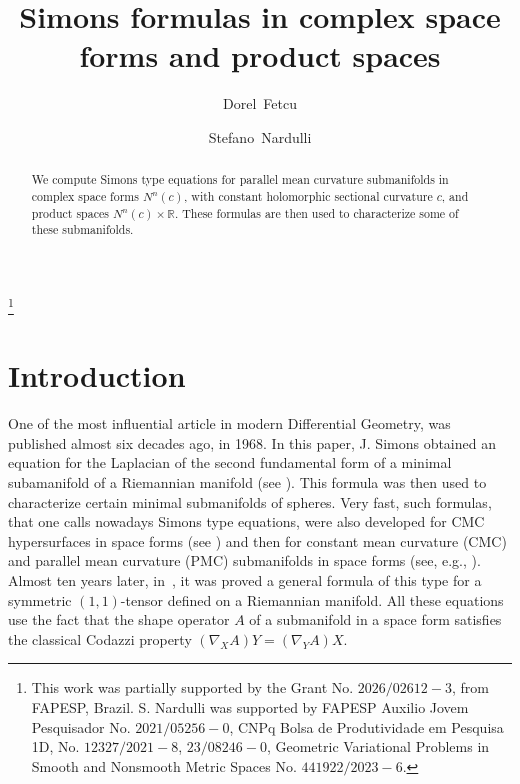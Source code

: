\documentclass[11pt]{amsart}
\theoremstyle{plain}
\theoremstyle{definition}
\numberwithin{equation}{section}
\begin{document}
\title[Simons Formulas]{Simons formulas in complex space forms and product spaces}

\author{Dorel~Fetcu}
\author{Stefano~Nardulli}

\thanks{This work was partially supported by the Grant No. $2026/02612-3$, from FAPESP, Brazil. S. Nardulli was supported by FAPESP Auxilio Jovem Pesquisador No. $2021/05256-0$, CNPq Bolsa de Produtividade em Pesquisa 1D, No. $12327/2021-8$, $23/08246-0$, Geometric Variational Problems in Smooth and Nonsmooth
Metric Spaces No. $441922/2023-6$.}

\address{Department of Mathematics and Informatics\\
Gh. Asachi Technical University of Iasi\\
Bd. Carol I, 11A \\
700506 Iasi, Romania} 

\address{Department of Mathematics\\ Federal University of ABC\\
09210-580, Santo Andr\'e-SP, Brazil}





\begin{abstract} We compute Simons type equations for parallel mean curvature submanifolds in complex space forms $N^n(c)$, with constant holomorphic sectional curvature $c$, and product spaces $N^n(c)\times\mathbb{R}$. These formulas are then used to characterize some of these submanifolds. 
\end{abstract}

\maketitle

\section{Introduction}

One of the most influential article in modern Differential Geometry, was published almost six decades ago, in 1968. In this paper, J. Simons obtained an equation for the Laplacian of the second fundamental form of a minimal subamanifold of a Riemannian manifold (see \cite{JS}). This formula was then used to characterize certain minimal submanifolds of spheres. Very fast, such formulas, that one calls nowadays Simons type equations, were also developed for CMC hypersurfaces in space forms (see \cite{NS}) and then for constant mean curvature (CMC) and parallel mean curvature (PMC) submanifolds in space forms (see, e.g., \cite{AdC,AT,WS,BS,Y1}). Almost ten years later, in~\cite{CY}, it was proved a general formula of this type for a symmetric $(1,1)$-tensor defined on a Riemannian manifold. All these equations use the fact that the shape operator $A$ of a submanifold in a space form satisfies the classical Codazzi property $(\nabla_XA)Y=(\nabla_YA)X$.
\end{document}
